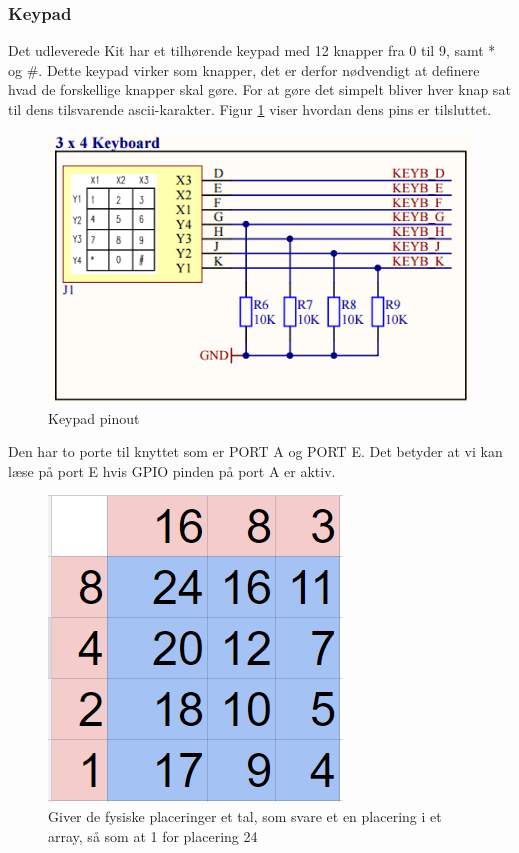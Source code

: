 \subsubsection{Keypad}

Det udleverede Kit har et tilhørende keypad med 12 knapper fra 0 til 9, samt * og \#. Dette keypad virker som knapper, det er derfor nødvendigt at definere hvad de forskellige knapper skal gøre. For at gøre det simpelt bliver hver knap sat til dens tilsvarende ascii-karakter. Figur \ref{fig:Keypadpins} viser hvordan dens pins er tilsluttet.
\begin{figure}[ht]
	\begin{center}
		\includegraphics[scale=0.7]{Billeder/Keypadpins.PNG}
	\end{center}
\caption{Keypad pinout}
\label{fig:Keypadpins}
\end{figure}
Den har to porte til knyttet som er PORT A og PORT E. Det betyder at vi kan læse på port E hvis GPIO pinden på port A er aktiv.
\begin{figure}[ht]
	\begin{center}
		\includegraphics[scale=0.7]{Billeder/keypad.PNG}
	\end{center}
\caption{Giver de fysiske placeringer et tal, som svare et en placering i et array, så som at 1 for placering 24}
\label{fig:Keypad}
\end{figure}


